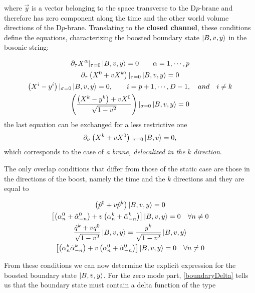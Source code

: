 where $\vec{y}$ is a vector belonging to the space transverse to the D$p$-brane and therefore has zero component along the time and the other world volume directions of the D$p$-brane. Translating to the \textbf{closed channel}, these conditions define the equations, characterizing the boosted boundary state $\ket{B,v,y}$ in the bosonic string:

\begin{gather}
\partial_\tau X^\alpha\vert_{\tau=0}\ket{B,v,y} = 0\quad\quad\alpha = 1,\cdots{},p\\
\partial_\tau\left(X^0 + vX^k\right)\vert_{\tau=0}\ket{B,v,y} = 0 \\
\left(X^i-y^i\right)\vert_{\sigma=0}\ket{B,v,y} = 0,\quad\quad i=p+1,\cdots{},D-1, \quad and\quad i\neq k \\
\left(\frac{\left(X^k-y^k\right)+vX^0}{\sqrt{1-v^2}}\right)\vert_{\sigma=0}\ket{B,v,y} = 0
\end{gather}
the last equation can be exchanged for a less restrictive one
\begin{equation}
\partial_\sigma\left(X^k+vX^0\right)\vert_{\tau=0}\ket{B,v} = 0,
\end{equation}
which corresponds to the case of \textit{a brane, delocalized in the} $k$ \textit{direction}.\\
\par The only overlap conditions that differ from those of the static case are those in the directions of the boost, namely the time and the $k$ directions and they are equal to

\begin{gather}
\left(\hat{p}^0 + v\hat{p}^k\right)\ket{B,v,y} = 0 \label{boundaryMomentum}\\
\left[\left(\alpha_n^0+\tilde{\alpha}_{-n}^0\right)+ v\left(\alpha_n^k+\tilde{\alpha}_{-n}^k\right) \right]\ket{B,v,y} = 0 \quad \forall n\neq 0 \label{boundaryNonzero1}\\
\frac{\hat{q}^k + vq^0}{\sqrt{1-v^2}}\ket{B,v,y} = \frac{y^k}{\sqrt{1-v^2}}\ket{B,v,y} \label{boundaryDelta}\\
\left[\left(\alpha_n^k\tilde{\alpha}_{-n}^k\right)+ v\left(\alpha_n^0+\tilde{\alpha}_{-n}^0\right) \right]\ket{B,v,y} = 0 \quad \forall n\neq 0
\label{boundaryNonzero2}
\end{gather}

From these conditions we can now determine the explicit expression for the boosted boundary state $\ket{B,v,y}$. For the zero mode part, \eqref{boundaryDelta} tells us that the boundary state must contain a delta function of the type


